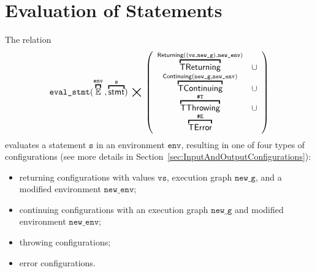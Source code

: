 \documentclass{book}
\newcommand\secref[1]{Section~\ref{sec:#1}}
\newcommand\overname[2]{\overbracket{#1}^{#2}}
\newcommand\aslrel[0]{\bigtimes}
\newcommand\aslsep[0]{\mathbf{,}}
\newcommand\ThrowingConfig[0]{\texttt{\#T}}
\newcommand\ErrorConfig[0]{\texttt{\#E}}
\newcommand\TError[0]{\textsf{TError}}
\newcommand\TThrowing[0]{\textsf{TThrowing}}
\newcommand\TContinuing[0]{\textsf{TContinuing}}
\newcommand\TReturning[0]{\textsf{TReturning}}
\newcommand\evalstmt[1]{\texttt{eval\_stmt}(#1)}
\newcommand\Continuing[0]{\textsf{Continuing}}
\newcommand\Returning[0]{\textsf{Returning}}
\newcommand\newenv[0]{\texttt{new\_env}}
\newcommand\env[0]{\texttt{env}}
\newcommand\newg[0]{\texttt{new\_g}}
\newcommand\vs[0]{\texttt{s}}
\newcommand\vvs[0]{\texttt{vs}}
\begin{document}

\chapter{Evaluation of Statements \label{chap:eval_stmt}}

The relation
\[
  \evalstmt{\overname{\envs}{\env} \aslsep \overname{\stmt}{\vs}} \;\aslrel\;
  \left(
  \begin{array}{cl}
  \overname{\TReturning}{\Returning((\vvs,\newg), \newenv)} & \cup\\
  \overname{\TContinuing}{\Continuing(\newg,\newenv)} & \cup\\
  \overname{\TThrowing}{\ThrowingConfig} & \cup \\
  \overname{\TError}{\ErrorConfig} &
  \end{array}
  \right)
\]
evaluates a statement $\vs$ in an environment $\env$, resulting in one of four types of configurations
(see more details in \secref{InputAndOutputConfigurations}):
\begin{itemize}
  \item returning configurations with values $\vvs$, execution graph $\newg$, and a modified environment $\newenv$;
  \item continuing configurations with an execution graph $\newg$ and modified environment $\newenv$;
  \item throwing configurations;
  \item error configurations.
\end{itemize}
\end{document}
